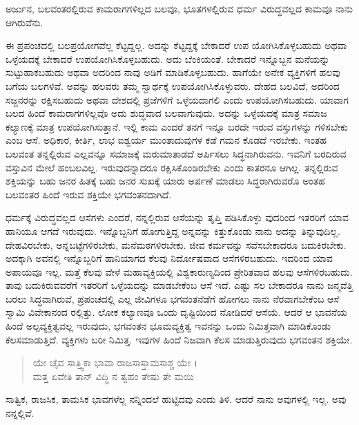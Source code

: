 {\small ಅರ್ಜುನ, ಬಲವಂತರಲ್ಲಿರುವ ಕಾಮರಾಗಗಳಿಲ್ಲದ ಬಲವೂ, ಭೂತಗಳಲ್ಲಿರುವ ಧರ್ಮ ವಿರುದ್ಧವಲ್ಲದ ಕಾಮವೂ ನಾನು ಆಗಿರುವೆನು.}

ಈ ಪ್ರಪಂಚದಲ್ಲಿ ಬಲಪ್ರಯೋಗವೆಲ್ಲ ಕೆಟ್ಟದ್ದಲ್ಲ. ಅದನ್ನು ಕೆಟ್ಟದ್ದಕ್ಕೆ ಬೇಕಾದರೆ ಉಪ ಯೋಗಿಸಿಕೊಳ್ಳಬಹುದು ಅಥವಾ ಒಳ್ಳೆಯದಕ್ಕೆ ಬೇಕಾದರೆ ಉಪಯೋಗಿಸಿಕೊಳ್ಳಬಹುದು. ಅದು ಬೆಂಕಿಯಂತೆ. ಬೇಕಾದರೆ ಇನ್ನೊಬ್ಬನ ಮನೆಯನ್ನು ಸುಟ್ಟುಹಾಕಬಹುದು ಅಥವಾ ಅದರಿಂದ ನಾವು ಅಡಿಗೆ ಮಾಡಿಕೊಳ್ಳಬಹುದು. ಹಾಗೆಯೇ ಅನೇಕ ವ್ಯಕ್ತಿಗಳಿಗೆ ಹಲವು ಬಗೆಯ ಬಲಗಳಿವೆ. ಅವನ್ನು ಹಲವರು ತಮ್ಮ ಸ್ವಾರ್ಥಕ್ಕೆ ಉಪಯೋಗಿಸಿಕೊಳ್ಳುವರು. ದೇಹದ ಬಲವಿದೆ, ಅದರಿಂದ ಸಜ್ಜನರನ್ನು ರಕ್ಷಿಸಬಹುದು ಅಥವಾ ದೇಶದಲ್ಲಿ ಪ್ರಜೆಗಳಿಗೆ ಒಳ್ಳೆಯದಾಗಲಿ ಎಂದು ಉಪಯೋಗಿಸಬಹುದು. ಯಾವಾಗ ಬಲದ ಹಿಂದೆ ಕಾಮರಾಗಗಳಿಲ್ಲವೊ ಅದು ಶುದ್ಧವಾದ ಬಲವಾಗುವುದು. ಅದನ್ನು ಒಳ್ಳೆಯದಕ್ಕೆ ಮಾತ್ರ ಸಮಾಜ ಕಲ್ಯಾಣಕ್ಕೆ ಮಾತ್ರ ಉಪಯೋಗಿಸುತ್ತಾನೆ. ಇಲ್ಲಿ ಕಾಮ ಎಂದರೆ ತನಗೆ ಇನ್ನೂ ಬರದೇ ಇರುವ ವಸ್ತುಗಳನ್ನು ಗಳಿಸಬೇಕು ಎಂಬ ಆಸೆ. ಅಧಿಕಾರ, ಕೀರ್ತಿ, ಲಾಭ ಐಶ್ವರ್ಯ ಮುಂತಾದುವುಗಳ ಕಡೆ ಗಮನ ಕೊಡದೆ ಇರಬೇಕು. ಇಂತಹ ಬಲವಂತ ತನ್ನಲ್ಲಿರುವ ಎಲ್ಲವನ್ನೂ ಸಮಾಜಕ್ಕೆ ಮರುಮಾತಾಡದೆ ಅರ್ಪಿಸಲು ಸಿದ್ಧನಾಗಿರುವನು. ಇವನಿಗೆ ಬರದಿರುವ ವಸ್ತುವಿನ ಮೇಲೆ ಹಂಬಲವಿಲ್ಲ. ಇರುವುದನ್ನಾದರೂ ರಕ್ಷಿಸಿಕೊಂಡಿರಬೇಕು ಎಂದು ಕಾತರನೂ ಆಗಿಲ್ಲ. ತನ್ನಲ್ಲಿರುವ ಶಕ್ತಿಯನ್ನು ಬಹು ಜನರ ಹಿತಕ್ಕೆ ಬಹು ಜನರ ಸುಖಕ್ಕೆ ಯಾರು ಅರ್ಪಣೆ ಮಾಡಲು ಸಿದ್ಧರಾಗಿರುವರೊ ಅಂತಹ ಬಲವಂತರ ಹಿಂದೆ ಇರುವ ಶಕ್ತಿಯೇ ಭಗವಂತನದಾಗಿದೆ.

ಧರ್ಮಕ್ಕೆ ವಿರುದ್ಧವಲ್ಲದ ಆಸೆಗಳು ಎಂದರೆ, ನನ್ನಲ್ಲಿರುವ ಆಸೆಯನ್ನು ತೃಪ್ತಿ ಪಡಿಸಿಕೊಳ್ಳು ವುದರಿಂದ ಇತರರಿಗೆ ಯಾವ ಹಾನಿಯೂ ಆಗದೆ ಇರುವುದು. ಇನ್ನೊಬ್ಬನಿಗೆ ಹೋಗುತ್ತಿದ್ದ ಅನ್ನವನ್ನು ಕಿತ್ತುಕೊಂಡು ನಾನು ಅದನ್ನು ತಿನ್ನುವುದಿಲ್ಲ. ದೇಹವಿರಬೇಕು, ಅನ್ನಬಟ್ಟೆಗಳಿರಬೇಕು, ಮನೆಮಠಗಳಿರಬೇಕು. ಜೀವ ಕರ್ಮವನ್ನು ಸವೆಸಬೇಕಾದರೂ ಬದುಕಿರಬೇಕು. ಅದಕ್ಕಾಗಿ ಅವನಲ್ಲಿ ಇನ್ನೊಬ್ಬರಿಗೆ ಹಾನಿಯಾಗದ ಕೆಲವು ನಿರ್ದೋಷವಾದ ಆಸೆಗಳಿರಬಹುದು. ಇದರಿಂದ ಯಾವ ಅಪಾಯವೂ ಇಲ್ಲ. ಮತ್ತೆ ಕೆಲವು ವೇಳೆ ಮಹಾವ್ಯಕ್ತಿಯಲ್ಲಿ ವಿಶ್ವಕಾರುಣ್ಯದಿಂದ ಪ್ರೇರಿತವಾದ ಹಲವು ಆಸೆಗಳಿರಬಹುದು. ತಾವು ಬದುಕಿರುವವರೆಗೆ ಇತರರಿಗೆ ಒಳ್ಳೆಯದನ್ನು ಮಾಡಬೇಕೆಂಬ ಆಸೆ ಇದೆ. ಎಷ್ಟು ಸಲ ಬೇಕಾದರೂ ನಾನು ಜನ್ಮವೆತ್ತಿ ಬರಲು ಸಿದ್ಧವಾಗಿರುವೆ, ಪ್ರಪಂಚದಲ್ಲಿ ಎಲ್ಲ ಜೀವಿಗಳೂ ಭಗವಂತನೆಡೆಗೆ ಹೋಗಲು ನಾನು ನೆರವಾಗಬೇಕೆಂಬ ಆಸೆ ಸ್ವಾಮಿ ವಿವೇಕಾನಂದ ರಲ್ಲಿತ್ತು. ಲೋಕ ಕಲ್ಯಾಣವೂ ಒಂದು ದೃಷ್ಟಿಯಿಂದ ನೋಡಿದರೆ ಆಸೆಯೆ. ಆದರೆ ಆ ಭಾವನೆಯ ಹಿಂದೆ ಅಲ್ಪವ್ಯಕ್ತಿತ್ವವಲ್ಲ ಇರುವುದು, ಭಗವಂತನ ಭೂಮವ್ಯಕ್ತಿತ್ವ ಇವನನ್ನು ಒಂದು ನಿಮಿತ್ತವಾಗಿ ಮಾಡಿಕೊಂಡು ಕೆಲಸಮಾಡುತ್ತಿದೆ. ವ್ಯಕ್ತಿಗಳು ಬರೀ ನಿಮಿತ್ತ. ಇವುಗಳ ಹಿಂದೆ ನಿಜವಾಗಿ ಕೆಲಸ ಮಾಡುತ್ತಿರುವುದು ಭಗವಂತನ ಶಕ್ತಿಯೇ.

\begin{verse}
ಯೇ ಚೈವ ಸಾತ್ತ್ವಿಕಾ ಭಾವಾ ರಾಜಸಾಸ್ತಾಮಸಾಶ್ಚ ಯೇ ।\\ಮತ್ತ ಏವೇತಿ ತಾನ್ ವಿದ್ಧಿ ನ ತ್ವಹಂ ತೇಷು ತೇ ಮಯಿ 
\end{verse}

{\small ಸಾತ್ವಿಕ, ರಾಜಸಿಕ, ತಾಮಸಿಕ ಭಾವಗಳೆಲ್ಲ ನನ್ನಿಂದಲೆ ಹುಟ್ಟಿದವು ಎಂದು ತಿಳಿ. ಆದರೆ ನಾನು ಅವುಗಳಲ್ಲಿ ಇಲ್ಲ. ಅವು ನನ್ನಲ್ಲಿವೆ.}


